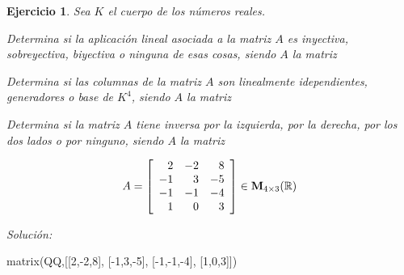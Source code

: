 \documentclass[12pt]{amsart}
\newtheorem{ejer}{Ejercicio}
\begin{document}
\begin{ejer} Sea $K$ el cuerpo de los n\'umeros reales.
\newline
\noindent\begin{minipage}{\textwidth}
\begin{tcolorbox}[colback = green!20!white,title=Versión Aplicaciones]
Determina si la aplicaci\'on lineal asociada a la matriz $A$ es inyectiva, sobreyectiva, biyectiva o ninguna de esas cosas, siendo $A$ la matriz \end{tcolorbox}
\end{minipage} \newline
\noindent\begin{minipage}{\textwidth}
\begin{tcolorbox}[colback = blue!20!white,title=Versión Vectores]
Determina si las columnas de la matriz $A$ son linealmente idependientes, generadores o base de $K^{4}$, siendo $A$ la matriz \end{tcolorbox}
\end{minipage} \newline
\noindent\begin{minipage}{\textwidth} 
\begin{tcolorbox}[colback = red!20!white,title=Versión Inversas]
Determina si la matriz $A$ tiene inversa por la izquierda, por la derecha, por los dos lados o por ninguno, siendo $A$ la matriz 
\end{tcolorbox}
\end{minipage}
\[ A = \left[\begin{array}{rrr}
2 & -2 & 8 \\
-1 & 3 & -5 \\
-1 & -1 & -4 \\
1 & 0 & 3
\end{array}\right] \in {\bf M}_{4\times 3}({\mathbb R})\]
\end{ejer}

{\it Soluci\'on:}

\begin{sageblock}
matrix(QQ,[[2,-2,8],
[-1,3,-5],
[-1,-1,-4],
[1,0,3]])
\end{sageblock}

\end{document}
